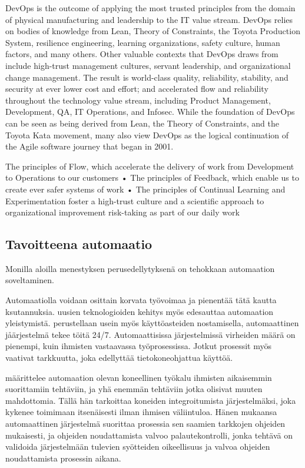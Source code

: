 \documentclass[finnish,12pt,a4paper,pdftex]{article}
\begin{document}
DevOps is the outcome of applying the most trusted principles from the
domain of physical manufacturing and leadership to the IT value stream.
DevOps relies on bodies of knowledge from Lean, Theory of Constraints,
the Toyota Production System, resilience engineering, learning organizations,
safety culture, human factors, and many others. Other valuable
contexts that DevOps draws from include high-trust management cultures,
servant leadership, and organizational change management. The result is
world-class quality, reliability, stability, and security at ever lower cost and
effort; and accelerated flow and reliability throughout the technology
value stream, including Product Management, Development, QA, IT Operations,
and Infosec.
While the foundation of DevOps can be seen as being derived from Lean, the
Theory of Constraints, and the Toyota Kata movement, many also view DevOps
as the logical continuation of the Agile software journey that began in 2001.

The principles of Flow, which accelerate the delivery of work from
Development to Operations to our customers
• The principles of Feedback, which enable us to create ever safer
systems of work
• The principles of Continual Learning and Experimentation foster
a high-trust culture and a scientific approach to organizational
improvement risk-taking as part of our daily work

\subsection{Tavoitteena automaatio}

Monilla aloilla menestyksen perusedellytyksenä on tehokkaan automaation soveltaminen. 

Automaatiolla voidaan osittain korvata työvoimaa ja pienentää tätä kautta ksutannuksia. 
uusien teknologioiden kehitys myös edesauttaa automaation yleistymistä.
perustellaan usein myös käyttöasteiden nostamisella, automaattinen jåärjestelmä tekee töitä 24/7.
Automaattisissa järjestelmissä virheiden määrä on pienempi, kuin ihmisten vastaavassa työprosessissa.
Jotkut prosessit myös vaativat tarkkuutta, joka edellyttää tietokoneohjattua käyttöä.

\cite{groover} määrittelee automaation olevan koneellinen työkalu ihmisten aikaisemmin suorittamiin tehtäviin, ja yhä enemmän tehtäviin jotka olisivat muuten mahdottomia. Tällä hän tarkoittaa koneiden integroitumista järjestelmäksi, joka kykenee toimimaan itsenäisesti ilman ihmisen väliintuloa. Hänen mukaansa automaattinen järjestelmä suorittaa prosessia sen saamien tarkkojen ohjeiden mukaisesti, ja ohjeiden noudattamista valvoo palautekontrolli, jonka tehtävä on validoida järjestelmään tulevien syötteiden oikeellisuus ja valvoa ohjeiden noudattamista prosessin aikana. 
\end{document}
